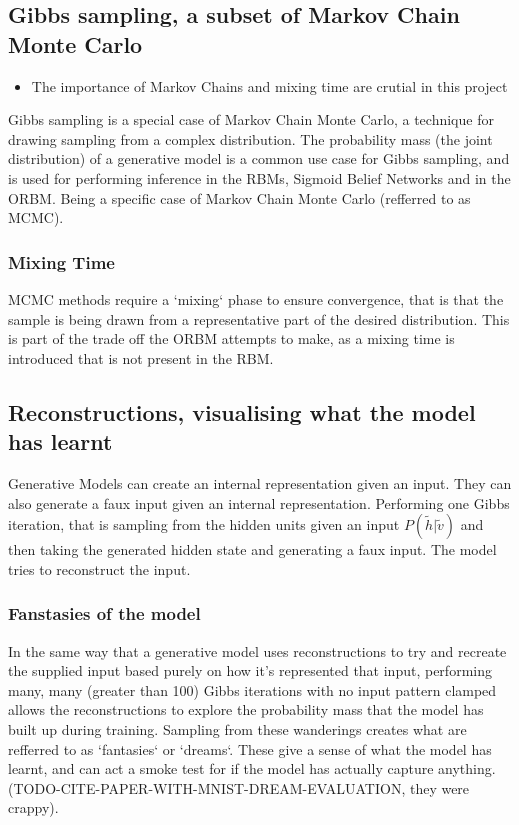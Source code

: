 \subsection{Gibbs sampling, a subset of Markov Chain Monte Carlo}

\begin{itemize}
  \item The importance of Markov Chains and mixing time are crutial in this project
\end{itemize}

Gibbs sampling is a special case of Markov Chain Monte Carlo, a technique for drawing sampling from a complex distribution. The probability mass (the joint distribution) of a generative model is a common use case for Gibbs sampling, and is used for performing inference in the RBMs, Sigmoid Belief Networks and in the ORBM. Being a specific case of Markov Chain Monte Carlo (refferred to as MCMC).

\subsubsection{Mixing Time}
MCMC methods require a `mixing` phase to ensure convergence, that is that the sample is being drawn from a representative part of the desired distribution. This is part of the trade off the ORBM attempts to make, as a mixing time is introduced that is not present in the RBM.

\subsection{Reconstructions, visualising what the model has learnt}

Generative Models can create an internal representation given an input. They can also generate a faux input given an internal representation. Performing one Gibbs iteration, that is sampling from the hidden units given an input $ P(\tilde{h}|\tilde{v}) $ and then taking the generated hidden state and generating a faux input. The model tries to reconstruct the input.

\subsubsection{Fanstasies of the model}
\todo%
In the same way that a generative model uses reconstructions to try and recreate the  supplied input based purely on how it's represented that input, performing many, many (greater than 100) Gibbs iterations with no input pattern clamped allows the reconstructions to explore the probability mass that the model has built up during training. Sampling from these wanderings creates what are refferred to as `fantasies` or `dreams`. These give a sense of what the model has learnt, and can act a smoke test for if the model has actually capture anything.
(TODO-CITE-PAPER-WITH-MNIST-DREAM-EVALUATION, they were crappy).
